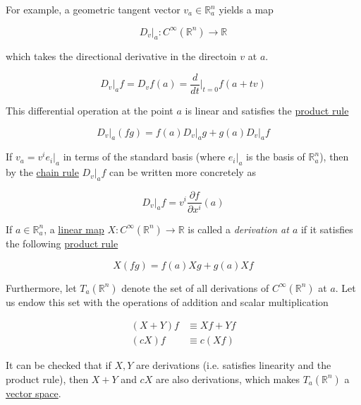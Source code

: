 \documentclass{article}
\newcounter{definition}[section]
\newcounter{example}[section]
\begin{document}
    For example, a geometric tangent vector $v_a \in \mathbb{R}^n_a$ yields a map

      \begin{equation}
        D_v \big|_a: C^\infty (\mathbb{R}^n) \to \mathbb{R}
      \end{equation}

    which takes the directional derivative in the directoin $v$ at $a$.

      \begin{equation}
        D_v \big|_a f = D_v f(a) = \frac{d}{dt} \bigg|_{t=0} f(a + t v)
      \end{equation}

    This differential operation at the point $a$ is linear and satisfies the \hyperref[mv-thm:product-rule-2]{product rule}

      \begin{equation}
        D_v \big|_a (f g) = f(a) D_v \big|_a g +g(a) D_v \big|_a f
      \end{equation}

    If $v_a = v^i e_i |_a$ in terms of the standard basis (where $e_i |_a$ is the basis of $\mathbb{R}^n_a$), then by the \hyperref[mv-thm:chain-rule]{chain rule} $D_v |_a f$ can be written more concretely as

      \begin{equation}
        D_v \big|_a f = v^i \frac{\partial f}{\partial x^i} (a)
      \end{equation}

    \begin{definition}[Derivation at $a$]
      \label{def:derivation-at-a}
      If $a \in \mathbb{R}^n_a$, a \hyperref[lin-def:linear_map]{linear map} $X: C^\infty (\mathbb{R}^n) \to \mathbb{R}$ is called a \textit{derivation at $a$} if it satisfies the following \hyperref[mv-thm:product-rule-2]{product rule} 

        \begin{equation}
          X (f g) = f(a) X g + g(a) X f
        \end{equation}

      Furthermore, let $T_a (\mathbb{R}^n)$ denote the set of all derivations of $C^\infty (\mathbb{R}^n)$ at $a$. Let us endow this set with the operations of addition and scalar multiplication 

      \begin{align*}
        (X + Y) f & \equiv X f + Y f \\
        (c X) f & \equiv c (X f)
      \end{align*}

      It can be checked that if $X, Y$ are derivations (i.e. satisfies linearity and the product rule), then $X + Y$ and $c X$ are also derivations, which makes $T_a (\mathbb{R}^n)$ a \hyperref[lin-def:vector-space]{vector space}. 
    \end{definition}
\end{document}
